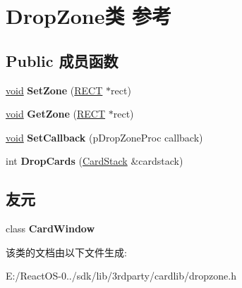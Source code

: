 \hypertarget{class_drop_zone}{}\section{Drop\+Zone类 参考}
\label{class_drop_zone}
\subsection*{Public 成员函数}
\begin{DoxyCompactItemize}
\item 
\mbox{\label{class_drop_zone_acc2c3dd4125aa45f4e7feab8ddb91994}} 
\hyperlink{interfacevoid}{void} {\bfseries Set\+Zone} (\hyperlink{structtag_r_e_c_t}{R\+E\+CT} $\ast$rect)
\item 
\mbox{\label{class_drop_zone_a0b9290e8830e6002ce63b6f40e0ce06e}} 
\hyperlink{interfacevoid}{void} {\bfseries Get\+Zone} (\hyperlink{structtag_r_e_c_t}{R\+E\+CT} $\ast$rect)
\item 
\mbox{\label{class_drop_zone_afa429c42a75dd9bd145ed385513309c4}} 
\hyperlink{interfacevoid}{void} {\bfseries Set\+Callback} (p\+Drop\+Zone\+Proc callback)
\item 
\mbox{\label{class_drop_zone_a0e4ca020d8ce4149f3ad9537d5f278ce}} 
int {\bfseries Drop\+Cards} (\hyperlink{class_card_stack}{Card\+Stack} \&cardstack)
\end{DoxyCompactItemize}
\subsection*{友元}
\begin{DoxyCompactItemize}
\item 
\mbox{\label{class_drop_zone_ab011d0f3b2396b3aacec9f12fc70b779}} 
class {\bfseries Card\+Window}
\end{DoxyCompactItemize}


该类的文档由以下文件生成\+:\begin{DoxyCompactItemize}
\item 
E\+:/\+React\+O\+S-\/0../sdk/lib/3rdparty/cardlib/dropzone.\+h\end{DoxyCompactItemize}
